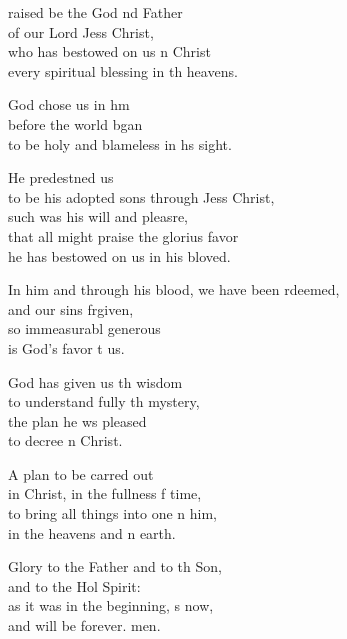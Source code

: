 \settowidth{\versewidth}{In him and through his blood, we have been redeemed, *}
\begin{psalmverse}%
  \begin{patverse}
raised be the God nd Father\Med\\
of our Lord Jess Christ,\\
who has bestowed on us n Christ\Med\\
every spiritual blessing in th heavens.

God chose us in h\pointup{\i}m\Flex\\
before the world bgan\Med\\
to be holy and blameless in h\pointup{\i}s sight.

He predestned us\Med\\
to be his adopted sons through Jess Christ,\\
such was his will and pleasre,\Flex\\
that all might praise the glorius favor\Med\\
he has bestowed on us in his bloved.

In him and through his blood, we have been rdeemed,\Med\\
and our sins frgiven,\\
so immeasurabl generous\Med\\
is God’s favor t us.

God has given us th wisdom\Med\\
to understand fully th mystery,\\
the plan he ws pleased\Med\\
to decree \pointup{\i}n Christ.

A plan to be carred out\Med\\
in Christ, in the fullness f time,\\
to bring all things into one n him,\Med\\
in the heavens and n earth.

Glory to the Father and to th Son,\Med\\
and to the Hol Spirit:\\
as it was in the beginning, s now,\Med\\
and will be forever. men.
  \end{patverse}
\end{psalmverse}
